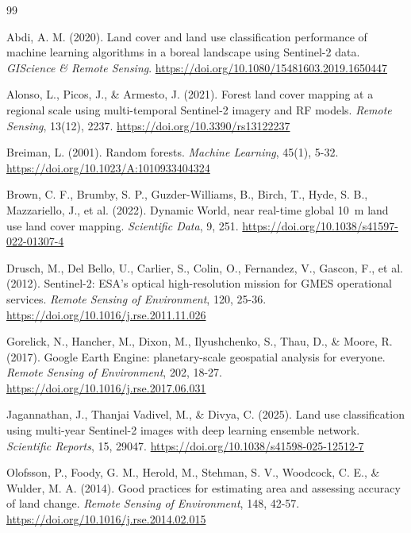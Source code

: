 \documentclass[11pt,a4paper]{article}
\begin{document}
\begin{thebibliography}{99}
\setlength{\itemsep}{2pt}\small

Abdi, A. M. (2020). Land cover and land use classification performance of machine learning algorithms in a boreal landscape using Sentinel-2 data. \textit{GIScience \& Remote Sensing}. \url{https://doi.org/10.1080/15481603.2019.1650447}

Alonso, L., Picos, J., \& Armesto, J. (2021). Forest land cover mapping at a regional scale using multi-temporal Sentinel-2 imagery and RF models. \textit{Remote Sensing}, 13(12), 2237. \url{https://doi.org/10.3390/rs13122237}

Breiman, L. (2001). Random forests. \textit{Machine Learning}, 45(1), 5-32. \url{https://doi.org/10.1023/A:1010933404324}

Brown, C. F., Brumby, S. P., Guzder-Williams, B., Birch, T., Hyde, S. B., Mazzariello, J., et al. (2022). Dynamic World, near real-time global 10~m land use land cover mapping. \textit{Scientific Data}, 9, 251. \url{https://doi.org/10.1038/s41597-022-01307-4}

Drusch, M., Del Bello, U., Carlier, S., Colin, O., Fernandez, V., Gascon, F., et al. (2012). Sentinel-2: ESA's optical high-resolution mission for GMES operational services. \textit{Remote Sensing of Environment}, 120, 25-36. \url{https://doi.org/10.1016/j.rse.2011.11.026}

Gorelick, N., Hancher, M., Dixon, M., Ilyushchenko, S., Thau, D., \& Moore, R. (2017). Google Earth Engine: planetary-scale geospatial analysis for everyone. \textit{Remote Sensing of Environment}, 202, 18-27. \url{https://doi.org/10.1016/j.rse.2017.06.031}

Jagannathan, J., Thanjai Vadivel, M., \& Divya, C. (2025). Land use classification using multi-year Sentinel-2 images with deep learning ensemble network. \textit{Scientific Reports}, 15, 29047. \url{https://doi.org/10.1038/s41598-025-12512-7}

Olofsson, P., Foody, G. M., Herold, M., Stehman, S. V., Woodcock, C. E., \& Wulder, M. A. (2014). Good practices for estimating area and assessing accuracy of land change. \textit{Remote Sensing of Environment}, 148, 42-57. \url{https://doi.org/10.1016/j.rse.2014.02.015}


\end{thebibliography}
\end{document}

